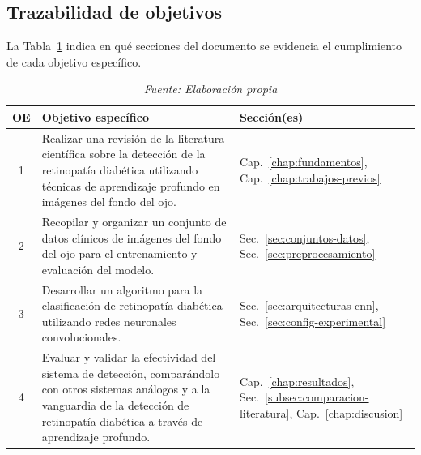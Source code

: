 \subsection*{Trazabilidad de objetivos}

La Tabla~\ref{tab:trazabilidad-objetivos} indica en qué secciones del documento se
evidencia el cumplimiento de cada objetivo específico.

\begin{table}[H]
\centering
\renewcommand{\arraystretch}{1.3}
\caption{Trazabilidad de los objetivos específicos}
\label{tab:trazabilidad-objetivos}
\begin{tabularx}{\textwidth}{c X l}
\hline
\textbf{OE} & \textbf{Objetivo específico} & \textbf{Sección(es)} \\ \hline
1 & Realizar una revisión de la literatura científica sobre la detección de la
retinopatía diabética utilizando técnicas de aprendizaje profundo en imágenes del fondo
del ojo. &
Cap.~\ref{chap:fundamentos}, Cap.~\ref{chap:trabajos-previos} \\
2 & Recopilar y organizar un conjunto de datos clínicos de imágenes del fondo del ojo
para el entrenamiento y evaluación del modelo. &
Sec.~\ref{sec:conjuntos-datos}, Sec.~\ref{sec:preprocesamiento} \\
3 & Desarrollar un algoritmo para la clasificación de retinopatía diabética utilizando
redes neuronales convolucionales. &
Sec.~\ref{sec:arquitecturas-cnn}, Sec.~\ref{sec:config-experimental} \\
4 & Evaluar y validar la efectividad del sistema de detección, comparándolo con otros
sistemas análogos y a la vanguardia de la detección de retinopatía diabética a través de
aprendizaje profundo. &
Cap.~\ref{chap:resultados}, Sec.~\ref{subsec:comparacion-literatura},
Cap.~\ref{chap:discusion} \\ \hline
\end{tabularx}
\caption*{\textit{Fuente: Elaboración propia}}
\end{table}

\pagebreak


